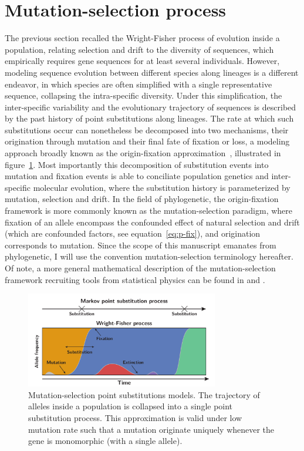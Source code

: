 \section{Mutation-selection process}
The previous section recalled the Wright-Fisher process of evolution inside a population, relating selection and drift to the diversity of sequences, which empirically requires gene sequences for at least several individuals.
However, modeling sequence evolution between different species along lineages is a different endeavor, in which species are often simplified with a single representative sequence, collapsing the intra-specific diversity.
Under this simplification, the inter-specific variability and the evolutionary trajectory of sequences is described by the past history of point \glspl{substitution} along lineages.
The rate at which such \glspl{substitution} occur can nonetheless be decomposed into two mechanisms, their origination through mutation and their final fate of fixation or loss, a modeling approach broadly known as the origin-fixation approximation~\citep{McCandlish2014}, illustrated in figure~\ref{fig:point-process}.
Most importantly this decomposition of \gls{substitution} events into mutation and fixation events is able to conciliate population genetics and inter-specific molecular evolution, where the \gls{substitution} history is parameterized by mutation, selection and drift.
In the field of phylogenetic, the origin-fixation framework is more commonly known as the mutation-selection paradigm, where fixation of an \gls{allele} encompass the confounded effect of natural selection and drift (which are confounded factors, see equation~\ref{eq:p-fix}), and origination corresponds to mutation.
Since the scope of this manuscript emanates from phylogenetic, I will use the convention mutation-selection terminology hereafter.
Of note, a more general mathematical description of the mutation-selection framework recruiting tools from statistical physics can be found in \citet{Sella2005} and \citet{Mustonen2009}.

\begin{figure}[H]
    \centering
    \includegraphics[width=0.75\textwidth]{figures/point-process.pdf}
    \caption[Mutation-selection point substitutions]{
    Mutation-selection point \glspl{substitution} models.
    The trajectory of \glspl{allele} inside a population is collapsed into a single point \gls{substitution} process.
    This approximation is valid under low mutation rate such that a mutation originate uniquely whenever the gene is monomorphic (with a single allele).}
    \label{fig:point-process}
\end{figure}

